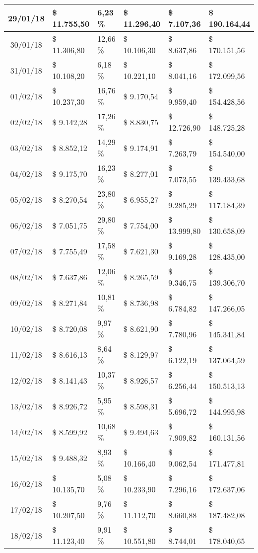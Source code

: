 \begin{small}
\begin{longtable}{|c|l|l|l|l|l|}
29/01/18 & \$ 11.755,50 & 6,23 \% & \$ 11.296,40 & \$ 7.107,36 & \$ 190.164,44 \\ \hline
30/01/18 & \$ 11.306,80 & 12,66 \% & \$ 10.106,30 & \$ 8.637,86 & \$ 170.151,56 \\ \hline
31/01/18 & \$ 10.108,20 & 6,18 \% & \$ 10.221,10 & \$ 8.041,16 & \$ 172.099,56 \\ \hline
01/02/18 & \$ 10.237,30 & 16,76 \% & \$ 9.170,54 & \$ 9.959,40 & \$ 154.428,56 \\ \hline
02/02/18 & \$ 9.142,28 & 17,26 \% & \$ 8.830,75 & \$ 12.726,90 & \$ 148.725,28 \\ \hline
03/02/18 & \$ 8.852,12 & 14,29 \% & \$ 9.174,91 & \$ 7.263,79 & \$ 154.540,00 \\ \hline
04/02/18 & \$ 9.175,70 & 16,23 \% & \$ 8.277,01 & \$ 7.073,55 & \$ 139.433,68 \\ \hline
05/02/18 & \$ 8.270,54 & 23,80 \% & \$ 6.955,27 & \$ 9.285,29 & \$ 117.184,39 \\ \hline
06/02/18 & \$ 7.051,75 & 29,80 \% & \$ 7.754,00 & \$ 13.999,80 & \$ 130.658,09 \\ \hline
07/02/18 & \$ 7.755,49 & 17,58 \% & \$ 7.621,30 & \$ 9.169,28 & \$ 128.435,00 \\ \hline
08/02/18 & \$ 7.637,86 & 12,06 \% & \$ 8.265,59 & \$ 9.346,75 & \$ 139.306,70 \\ \hline
09/02/18 & \$ 8.271,84 & 10,81 \% & \$ 8.736,98 & \$ 6.784,82 & \$ 147.266,05 \\ \hline
10/02/18 & \$ 8.720,08 & 9,97 \% & \$ 8.621,90 & \$ 7.780,96 & \$ 145.341,84 \\ \hline
11/02/18 & \$ 8.616,13 & 8,64 \% & \$ 8.129,97 & \$ 6.122,19 & \$ 137.064,59 \\ \hline
12/02/18 & \$ 8.141,43 & 10,37 \% & \$ 8.926,57 & \$ 6.256,44 & \$ 150.513,13 \\ \hline
13/02/18 & \$ 8.926,72 & 5,95 \% & \$ 8.598,31 & \$ 5.696,72 & \$ 144.995,98 \\ \hline
14/02/18 & \$ 8.599,92 & 10,68 \% & \$ 9.494,63 & \$ 7.909,82 & \$ 160.131,56 \\ \hline
15/02/18 & \$ 9.488,32 & 8,93 \% & \$ 10.166,40 & \$ 9.062,54 & \$ 171.477,81 \\ \hline
16/02/18 & \$ 10.135,70 & 5,08 \% & \$ 10.233,90 & \$ 7.296,16 & \$ 172.637,06 \\ \hline
17/02/18 & \$ 10.207,50 & 9,76 \% & \$ 11.112,70 & \$ 8.660,88 & \$ 187.482,08 \\ \hline
18/02/18 & \$ 11.123,40 & 9,91 \% & \$ 10.551,80 & \$ 8.744,01 & \$ 178.040,65 \\ \hline

\end{longtable}
\end{small}
